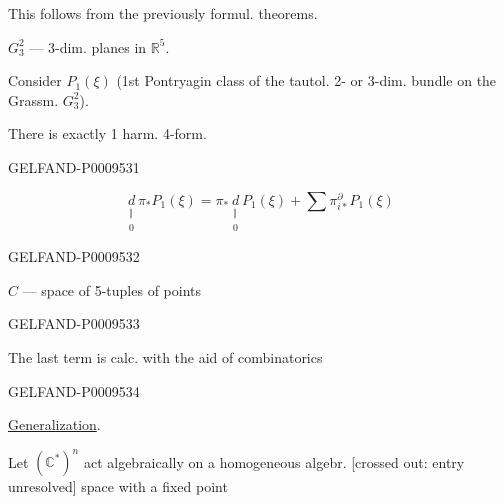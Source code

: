 This follows from the previously formul. theorems.

$G_3^2$ --- 3-dim. planes in $\mathbb R^5$.

Consider $P_1(\xi)$ (1st Pontryagin class of the tautol. 2- or 3-dim. bundle on the Grassm. $G_3^2$).

There is exactly 1 harm. 4-form.

\begin{GelfandAdjacentEvidence}{GELFAND-P000953}{1}

\[
 \underset{\substack{\Vert\\0}}{d}\pi_*P_1(\xi)
 =\pi_*\underset{\substack{\Vert\\0}}{d}P_1(\xi)
 +\sum\pi_{i*}^{\partial}P_1(\xi)
\]
\end{GelfandAdjacentEvidence}
\begin{GelfandAdjacentEvidence}{GELFAND-P000953}{2}

$C$ --- space of 5-tuples of points

\end{GelfandAdjacentEvidence}
\begin{GelfandAdjacentEvidence}{GELFAND-P000953}{3}


The last term is calc. with the aid of combinatorics
\end{GelfandAdjacentEvidence}
\begin{GelfandAdjacentEvidence}{GELFAND-P000953}{4}


\underline{Generalization}.

Let $(\mathbb C^*)^n$ act algebraically on a homogeneous algebr. [crossed out: entry unresolved] space with a fixed point
\end{GelfandAdjacentEvidence}
